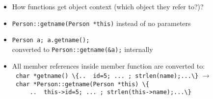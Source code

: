 \begin{frame}
\begin{itemize}
\item How functions get object context (which object they refer to?)?
\item \lstinline!Person::getname(Person *this)! instead of no parameters
\item \lstinline!Person a; a.getname();!\\
      converted to \lstinline!Person::getname(&a);! internally
\item All member references inside member function are converted to:\\
      \lstinline! char *getname() \{..  id=5; ... ; strlen(name);...\}! $\rightarrow$ \\
      \lstinline! char *Person::getname(Person *this) \{!\\ 
      \lstinline!     ..  this->id=5; ... ; strlen(this->name);...\}!\\
\end{itemize}
\end{frame}

